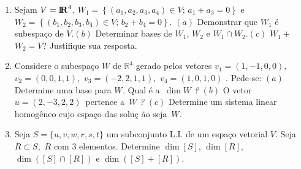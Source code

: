 \documentclass{report}
\begin{document}
\begin{Exercise}
\begin{enumerate}

\item \label{23lista3} Sejam $V=%
\mbox{${\rm I}\!\mbox{\boldmath $ {\rm R}$}$}%
^{4}$, $W_{1}=\left\{ \left( a_{1},a_{2},a_{3},a_{4}\right) \in
V;\,a_{1}+a_{3}=0\right\} $ e $W_{2}=\left\{ \left(
b_{1},b_{2},b_{3},b_{4}\right) \in V;\,b_{2}+b_{4}=0\right\} $.
\newline $(a)$ Demonstrar que $W_{1}$ \'{e} subespa\c{c}o de
$V$.\newline $(b)$ Determinar bases de $W_{1}$, $W_{2}$ e
$W_{1}\cap W_{2}$.\newline $(c)$ $W_{1}+$ $W_{2}=V$? Justifique
sua resposta.


\item \label{24lista3} Considere o subespa\c{c}o $W$ de
$\mathbb{R}^{4}$ gerado pelos
vetores $v_{1}=\left( 1,-1,0,0\right) ,$ $v_{2}=\left( 0,0,1,1\right) ,$ $%
v_{3}=\left( -2,2,1,1\right) ,$ $v_{4}=\left( 1,0,1,0\right) $ . Pede-se:%
\newline
$(a)$ Determine uma base para $W$\textit{. } Qual \'{e} a\textit{\ }$\dim W$%
\textit{?}\newline
$(b)$ O vetor\textit{\ }$u=\left( 2,-3,2,2\right) $\ pertence a\textit{\ }$W$%
\textit{?}\newline
$(c)$ Determine um sistema linear homog\^{e}neo cujo espa\c{c}o das solu\c{c}%
\~{a}o seja\textit{\ }$W$\textit{.}


\item \label{25lista3} Seja $S=\{u,v,w,r,s,t\}$ um subconjunto
L.I. de um espa\c{c}o vetorial $V$. Seja $R\subset S,$ $R$ com $3$
elementos. Determine $\dim \left[ S\right] $, $\dim \left[
R\right] $, $\dim \left( \left[ S\right] \cap \left[ R\right]
\right) $ e $\dim \left( \left[ S\right] +\left[ R\right] \right)
.$



\end{enumerate}
\end{Exercise}
\end{document}
